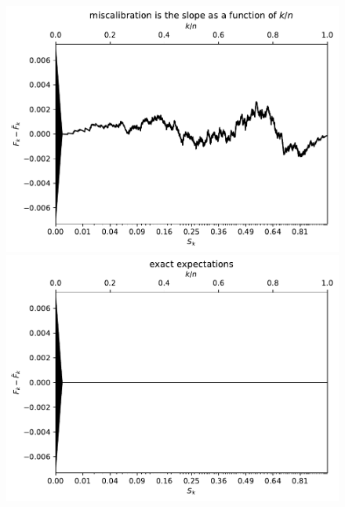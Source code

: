 \documentclass{article}
\begin{document}
\begin{figure}
\begin{centering}

\parbox{\imsize}{\includegraphics[width=\imsize]
                {./codes/unweighted/10000_10_1_3/cumulative.pdf}}
\quad\quad
\parbox{\imsize}{\includegraphics[width=\imsize]
                {./codes/unweighted/10000_10_1_3/cumulative_exact.pdf}}

\vspace{\vertsep}


\end{centering}
\end{figure}
\end{document}
